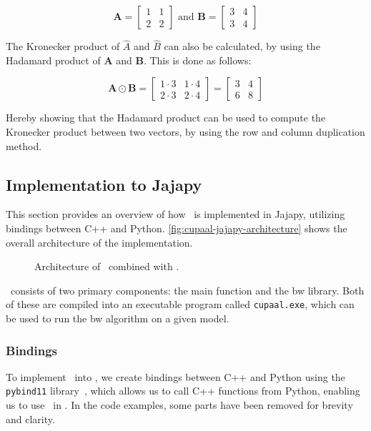 \[ \mathbf{A} = \begin{bmatrix}
        1 & 1 \\
        2 & 2
    \end{bmatrix} \text{ and }
    \mathbf{B} = \begin{bmatrix}
        3 & 4 \\
        3 & 4
    \end{bmatrix}
\]

The Kronecker product of $\hat{A}$ and $\hat{B}$ can also be calculated, by using the Hadamard product of $\mathbf{A}$ and $\mathbf{B}$.
This is done as follows:


\begin{equation}
    \mathbf{A} \odot \mathbf{B} = \begin{bmatrix}
        1 \cdot 3 & 1 \cdot 4 \\
        2 \cdot 3 & 2 \cdot 4
    \end{bmatrix} = \begin{bmatrix}
        3 & 4 \\
        6 & 8
    \end{bmatrix}
\end{equation}


Hereby showing that the Hadamard product can be used to compute the Kronecker product between two vectors, by using the row and column duplication method.

\subsection{Implementation to Jajapy}\label{subsec:implementation-to-jajapy}
This section provides an overview of how \Cupaal\ is implemented in Jajapy, utilizing bindings between C++ and Python. \autoref{fig:cupaal-jajapy-architecture} shows the overall architecture of the implementation.


\begin{figure}
    \centering
    
    \caption{Architecture of \Cupaal\ combined with \Jajapy.}
    \label{fig:cupaal-jajapy-architecture}
\end{figure}

\Cupaal\ consists of two primary components: the main function and the \gls{bw} library. Both of these are compiled into an executable program called \texttt{cupaal.exe}, which can be used to run the \gls{bw} algorithm on a given model.

\subsubsection{Bindings}\label{subsubsec:bindings}
To implement \Cupaal\ into \Jajapy, we create bindings between C++ and Python using the \texttt{pybind11} library~\cite{pybind11github}, which allows us to call C++ functions from Python, enabling us to use \Cupaal\ in \Jajapy.
In the code examples, some parts have been removed for brevity and clarity.


